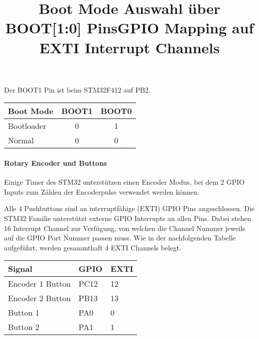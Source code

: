 Der BOOT1 Pin ist beim STM32F412 auf PB2.

\begin{table}[H]
\title{Boot Mode Auswahl über BOOT[1:0] Pins}
\centering
\begin{tabular}{|l|c|c|}
\hline
\textbf{Boot Mode} & \textbf{BOOT1} & \textbf{BOOT0} \\ \hline
Bootloader         & 0              & 1              \\ \hline
Normal             & 0              & 0              \\ \hline
\end{tabular}
\end{table}


\paragraph{Rotary Encoder und Buttons}

Einige Timer des STM32 unterstützen einen Encoder Modus, bei dem 2 GPIO Inputs zum Zählen der Encoderpulse verwendet werden können.

Alle 4 Pushbuttons sind an interruptfähige (EXTI) GPIO Pins angeschlossen. 
Die STM32 Familie unterstützt externe GPIO Interrupts an allen Pins. 
Dabei stehen 16 Interrupt Channel zur Verfügung, von welchen die Channel Nummer jeweils auf die GPIO Port Nummer passen muss. 
Wie in der nachfolgenden Tabelle aufgeführt, werden gesammthaft 4 EXTI Channels belegt.

\begin{table}[H]
\title{GPIO Mapping auf EXTI Interrupt Channels}
\centering
\begin{tabular}{|l|l|l|}
\hline
\textbf{Signal}  & \textbf{GPIO} & \textbf{EXTI} \\ \hline
Encoder 1 Button & PC12          & 12            \\ \hline
Encoder 2 Button & PB13          & 13            \\ \hline
Button 1         & PA0           & 0             \\ \hline
Button 2         & PA1           & 1             \\ \hline
\end{tabular}
\end{table}





